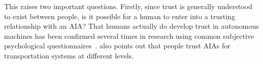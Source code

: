         This raises two important questions. Firstly, since trust is generally understood to exist between people, is it possible for a human to enter into a trusting relationship with an AIA? 
        That humans actually do develop trust in autonomous machines has been confirmed several times in research using common subjective psychological questionnaires~\cite{Muir1996-gt,Mcknight2011-gv,Riley1996-qm,Bainbridge2011-pl,Salem2015-md,Desai2012-rc, Freedy2007-sg, Kaniarasu2013-ho, Wang2016-id}. 
        \citet{Lacher2014-yc} also points out that people trust AIAs for transportation systems at different levels. 
